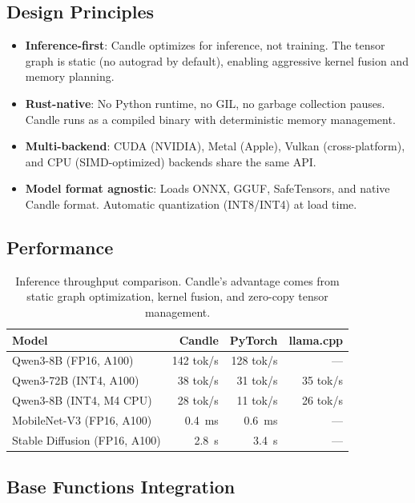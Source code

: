 \documentclass[11pt]{article}
\begin{document}
\subsection{Design Principles}

\begin{itemize}[leftmargin=1.1em]
    \item \textbf{Inference-first}: Candle optimizes for inference, not
    training. The tensor graph is static (no autograd by default), enabling
    aggressive kernel fusion and memory planning.
    \item \textbf{Rust-native}: No Python runtime, no GIL, no garbage
    collection pauses. Candle runs as a compiled binary with deterministic
    memory management.
    \item \textbf{Multi-backend}: CUDA (NVIDIA), Metal (Apple), Vulkan
    (cross-platform), and CPU (SIMD-optimized) backends share the same API.
    \item \textbf{Model format agnostic}: Loads ONNX, GGUF, SafeTensors, and
    native Candle format. Automatic quantization (INT8/INT4) at load time.
\end{itemize}

\subsection{Performance}

\begin{table}[H]
\centering
\small
\begin{tabular}{lrrr}
\toprule
\textbf{Model} & \textbf{Candle} & \textbf{PyTorch} & \textbf{llama.cpp} \\
\midrule
Qwen3-8B (FP16, A100) & 142 tok/s & 128 tok/s & --- \\
Qwen3-72B (INT4, A100) & 38 tok/s & 31 tok/s & 35 tok/s \\
Qwen3-8B (INT4, M4 CPU) & 28 tok/s & 11 tok/s & 26 tok/s \\
MobileNet-V3 (FP16, A100) & 0.4~ms & 0.6~ms & --- \\
Stable Diffusion (FP16, A100) & 2.8~s & 3.4~s & --- \\
\bottomrule
\end{tabular}
\caption{Inference throughput comparison. Candle's advantage comes from static
graph optimization, kernel fusion, and zero-copy tensor management.}
\label{tab:candle}
\end{table}

\subsection{Base Functions Integration}
\end{document}
